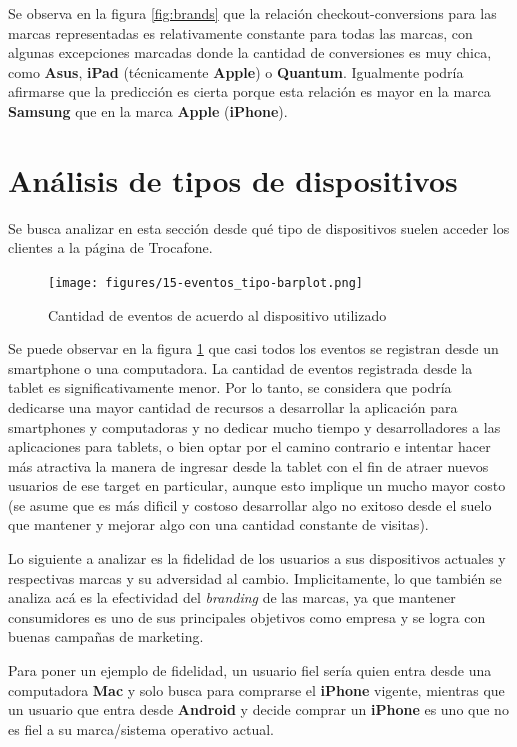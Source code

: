 \documentclass[a4paper]{article}
\begin{document}
Se observa en la figura \ref{fig:brands} que la relación checkout-conversions para las marcas representadas es relativamente constante para todas las marcas, con algunas excepciones marcadas donde la cantidad de conversiones es muy chica, como \textbf{Asus}, \textbf{iPad} (técnicamente \textbf{Apple}) o \textbf{Quantum}. Igualmente podría afirmarse que la predicción es cierta porque esta relación es mayor en la marca \textbf{Samsung} que en la marca \textbf{Apple} (\textbf{iPhone}).

\section{Análisis de tipos de dispositivos}

Se busca analizar en esta sección desde qué tipo de dispositivos suelen acceder los clientes a la página de Trocafone.

\begin{figure}[h!]
	\texttt{[image: figures/15-eventos\_tipo-barplot.png]}
	\caption{Cantidad de eventos de acuerdo al dispositivo utilizado}
	\label{fig:dispositivos}
\end{figure}

Se puede observar en la figura \ref{fig:dispositivos} que casi todos los eventos se registran desde un smartphone o una computadora. La cantidad de eventos registrada desde la tablet es significativamente menor. Por lo tanto, se considera que podría dedicarse una mayor cantidad de recursos a desarrollar la aplicación para smartphones y computadoras y no dedicar mucho tiempo y desarrolladores a las aplicaciones para tablets, o bien optar por el camino contrario e intentar hacer más atractiva la manera de ingresar desde la tablet con el fin de atraer nuevos usuarios de ese target en particular, aunque esto implique un mucho mayor costo (se asume que es más dificil y costoso desarrollar algo no exitoso desde el suelo que mantener y mejorar algo con una cantidad constante de visitas).

Lo siguiente a analizar es la fidelidad de los usuarios a sus dispositivos actuales y respectivas marcas y su adversidad al cambio. Implicitamente, lo que también se analiza acá es la efectividad del \textit{branding} de las marcas, ya que mantener consumidores es uno de sus principales objetivos como empresa y se logra con buenas campañas de marketing.

Para poner un ejemplo de fidelidad, un usuario fiel sería quien entra desde una computadora \textbf{Mac} y solo busca para comprarse el \textbf{iPhone} vigente, mientras que un usuario que entra desde \textbf{Android} y decide comprar un \textbf{iPhone} es uno que no es fiel a su marca/sistema operativo actual.
\end{document}
